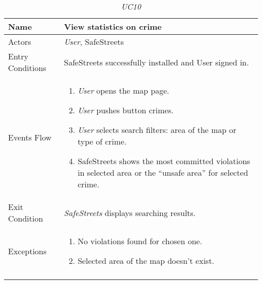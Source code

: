 \documentclass[../../../RASD.tex]{subfiles}
\begin{document}
    \begin{center}
        \begin{longtable}{| p{.35\linewidth} | p{.65\linewidth} |}
            \hline
            \textbf{Name} & \textbf{View statistics on crime}\\ \hline
            Actors & \textit{User}, SafeStreets\\ \hline
            Entry Conditions & SafeStreets successfully installed and User signed in.\\ \hline
            Events Flow &
            \begin{enumerate}
                \item \textit{User} opens the map page.
                \item \textit{User} pushes button crimes.
                \item \textit{User} selects search filters: area of the map or type of crime.
                \item  SafeStreets shows the most committed violations in selected area or the “unsafe area” for selected crime.
            \end{enumerate}
            \\ \hline
            Exit Condition & \textit{SafeStreets} displays searching results.\\ \hline
            Exceptions &
            \begin{enumerate}
                \item No violations found for chosen one.
                \item Selected area of the map doesn’t exist.
            \end{enumerate}
            \\
            \hline
            \caption[\textit{Use Case 10}]{\textit{UC10}}
        \end{longtable}
    \end{center}
    \newpage
\end{document}
